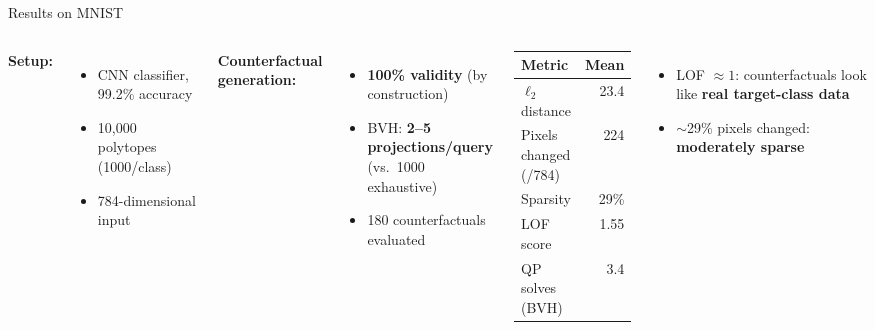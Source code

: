 \documentclass[aspectratio=169, 11pt]{beamer}
\begin{document}
\begin{frame}{Results on MNIST}

\begin{columns}[T]
\textbf{Setup:}
\begin{itemize}
  \item CNN classifier, 99.2\% accuracy
  \item 10,000 polytopes (1000/class)
  \item 784-dimensional input
\end{itemize}

\bigskip

\textbf{Counterfactual generation:}
\begin{itemize}
  \item \textbf{100\% validity} (by construction)
  \item BVH: \textbf{2--5 projections/query}\\(vs.\ 1000 exhaustive)
  \item 180 counterfactuals evaluated
\end{itemize}

\begin{center}
\begin{tabular}{lr}
  \toprule
  \textbf{Metric} & \textbf{Mean} \\
  \midrule
  $\ell_2$ distance           & 23.4  \\
  Pixels changed (/784)       & 224   \\
  Sparsity                    & 29\%  \\
  LOF score                   & 1.55  \\
  QP solves (BVH)             & 3.4   \\
  \bottomrule
\end{tabular}
\end{center}

\bigskip

\begin{itemize}
  \item LOF $\approx 1$: counterfactuals look like \textbf{real target-class data}
  \item $\sim$29\% pixels changed: \textbf{moderately sparse}
\end{itemize}
\end{columns}

\end{frame}

\end{document}
